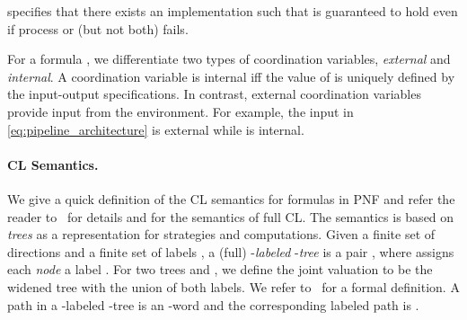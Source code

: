 \documentclass{LMCS}
\theoremstyle{plain}\newtheorem{theorem}[thm]{Theorem}
\theoremstyle{plain}\newtheorem{lemma}[thm]{Lemma}
\theoremstyle{plain}\newtheorem{proposition}[thm]{Proposition}
\theoremstyle{plain}\newtheorem{corollary}[thm]{Corollary}
\theoremstyle{definition}\newtheorem{definition}{Definition}[section]
\begin{document}
specifies that there exists an implementation such that  is guaranteed to hold even if process  or  (but not both) fails.

For a formula , we differentiate two types of coordination variables, \emph{external} and \emph{internal}.
A coordination variable  is internal iff the value of  is uniquely defined by the input-output specifications.
In contrast, external coordination variables provide input from the environment.
For example, the input  in \eqref{eq:pipeline_architecture} is external while  is internal.

\paragraph{\bf CL Semantics.} \label{sec:cl_semantics}
We give a quick definition of the CL semantics for formulas in PNF and refer the reader to~\cite{DBLP:conf/csl/FinkbeinerS10} for details and for the semantics of full CL\@.
The semantics is based on 
\emph{trees} as a representation for strategies and computations.
Given a finite set of directions  and a finite set of labels , a (full) -\textit{labeled} -\textit{tree}  is a pair , where  assigns each \textit{node}  a label .
For two trees  and , we define the joint valuation  to be the widened tree with the union of both labels.
We refer to~\cite{DBLP:conf/csl/FinkbeinerS10} for a formal definition.
A path  in a -labeled -tree  is an -word  and the corresponding labeled path  is .
\end{document}
